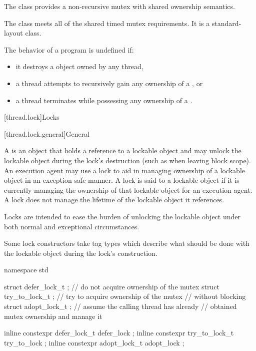 \pnum
The class  provides a non-recursive mutex with shared
ownership semantics.

\pnum
The class  meets
all of the shared timed mutex requirements.
It is a standard-layout class.

\pnum
The behavior of a program is undefined if:
\begin{itemize}
\item it destroys a  object owned by any thread,
\item a thread attempts to recursively gain any ownership of a , or
\item a thread terminates while possessing any ownership of a .
\end{itemize}

[thread.lock]{Locks}

[thread.lock.general]{General}

\pnum
A  is an object that holds a reference to a lockable object and may unlock the
lockable object during the lock's destruction (such as when leaving block scope). An execution
agent may use a lock to aid in managing ownership of a lockable object in an exception safe
manner. A lock is said to  a lockable object if it is currently managing the
ownership of that lockable object for an execution agent. A lock does not manage the lifetime
of the lockable object it references.
\begin{note}
Locks are intended to ease the burden of
unlocking the lockable object under both normal and exceptional circumstances.
\end{note}

\pnum
Some lock constructors take tag types which describe what should be done with the lockable
object during the lock's construction.

%
%
%
%
%
%
\begin{codeblock}
namespace std {
  struct defer_lock_t  { };     // do not acquire ownership of the mutex
  struct try_to_lock_t { };     // try to acquire ownership of the mutex
                                // without blocking
  struct adopt_lock_t  { };     // assume the calling thread has already
                                // obtained mutex ownership and manage it

  inline constexpr defer_lock_t   defer_lock { };
  inline constexpr try_to_lock_t  try_to_lock { };
  inline constexpr adopt_lock_t   adopt_lock { };
}
\end{codeblock}

